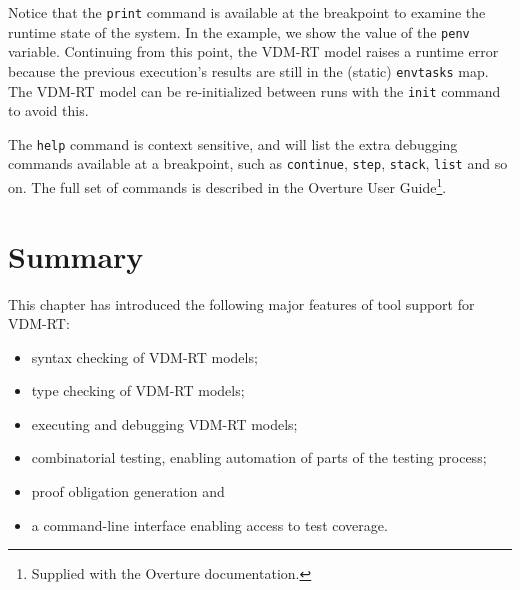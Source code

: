 \noindent Notice that the \verb|print| command is available at the breakpoint
to examine the runtime state of the system. In the example, we show the value
of the \verb|penv| variable. Continuing from this point, the VDM-RT model
raises a runtime error because the previous execution's results are still in
the (static) \verb|envtasks| map. The VDM-RT model can be re-initialized
between runs with the \verb|init| command to avoid this.

The \verb|help| command is context sensitive, and will list the extra debugging
commands available at a breakpoint, such as \verb|continue|, \verb|step|,
\verb|stack|, \verb|list| and so on. The full set of commands is described in the
Overture User Guide\footnote{Supplied with the Overture documentation.}.

\lstset{style=mystyle}

\lstset{style=mystyle,language=VDM++}

\section{Summary}\label{sec:toolintrosummary}

This chapter has introduced the following major features of tool
support for VDM-RT:
\begin{itemize}
\item syntax checking of VDM-RT models;
\item type checking of VDM-RT models;
\item executing and debugging VDM-RT models;
\item combinatorial testing, enabling automation of parts of the
  testing process; 
\item proof obligation generation and
\item a command-line interface enabling access to test coverage.
\end{itemize}
